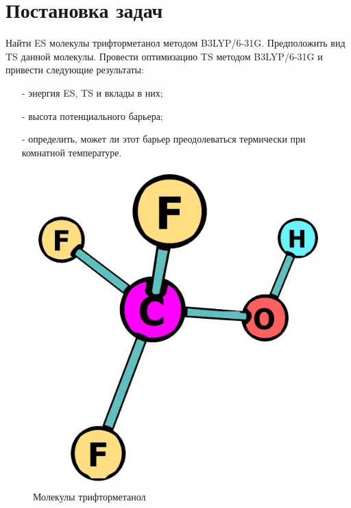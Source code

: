 \section{Постановка задач}
Найти ES молекулы трифторметанол методом B3LYP/6-31G. Предположить вид TS данной молекулы. Провести оптимизацию TS методом B3LYP/6-31G и привести следующие результаты:
\begin{itemize}
    \item[-] энергия ES, TS и вклады в них;
    \item[-] высота потенциального барьера;
    \item[-] определить, может ли этот барьер преодолеваться термически при комнатной температуре.
\end{itemize}

\begin{figure}[H]
\centering
\captionsetup{justification=centering}
\includegraphics[scale=0.4]{fig/0.jpg}
\caption{Молекулы трифторметанол}
\end{figure}